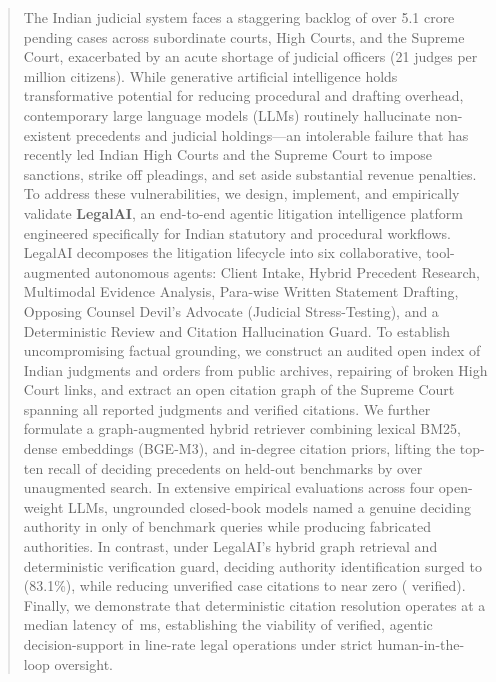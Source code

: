 \documentclass[conference]{IEEEtran}
\begin{document}
\begin{abstract}
The Indian judicial system faces a staggering backlog of over 5.1 crore pending cases across subordinate courts, High Courts, and the Supreme Court, exacerbated by an acute shortage of judicial officers (21 judges per million citizens). While generative artificial intelligence holds transformative potential for reducing procedural and drafting overhead, contemporary large language models (LLMs) routinely hallucinate non-existent precedents and judicial holdings—an intolerable failure that has recently led Indian High Courts and the Supreme Court to impose sanctions, strike off pleadings, and set aside substantial revenue penalties. To address these vulnerabilities, we design, implement, and empirically validate \textbf{LegalAI}, an end-to-end agentic litigation intelligence platform engineered specifically for Indian statutory and procedural workflows. LegalAI decomposes the litigation lifecycle into six collaborative, tool-augmented autonomous agents: Client Intake, Hybrid Precedent Research, Multimodal Evidence Analysis, Para-wise Written Statement Drafting, Opposing Counsel Devil's Advocate (Judicial Stress-Testing), and a Deterministic Review and Citation Hallucination Guard. To establish uncompromising factual grounding, we construct an audited open index of \CorpusTotal{} Indian judgments and orders from public archives, repairing \MobileLinkedPct{} of broken High Court links, and extract an open citation graph of the Supreme Court spanning all \GraphTextOK{} reported judgments and \GraphEdges{} verified citations. We further formulate a graph-augmented hybrid retriever combining lexical BM25, dense embeddings (BGE-M3), and in-degree citation priors, lifting the top-ten recall of deciding precedents on held-out benchmarks by \RecPriorRelGain{} over unaugmented search. In extensive empirical evaluations across four open-weight LLMs, ungrounded closed-book models named a genuine deciding authority in only \RefAllClosed{} of \RefQuestionsAll{} benchmark queries while producing \AuditNFFab{} fabricated authorities. In contrast, under LegalAI's hybrid graph retrieval and deterministic verification guard, deciding authority identification surged to \RefAllTopicPrior{} (83.1\%), while reducing unverified case citations to near zero (\VerPctAllTopicPrior{} verified). Finally, we demonstrate that deterministic citation resolution operates at a median latency of \VerifyMedianMs{}\,ms, establishing the viability of verified, agentic decision-support in line-rate legal operations under strict human-in-the-loop oversight.
\end{abstract}
\end{document}

